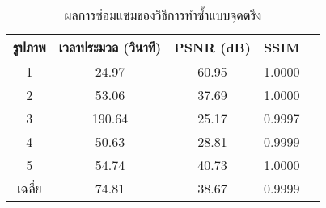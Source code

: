 \begin{table}[H]
	\centering
	\begin{tabular}[ht]{|c|c|c|c|c|}
		\hline
		รูปภาพ &เวลาประมวล  (วินาที) & PSNR (dB) & SSIM \\
		\hline
		1 & 24.97 & 60.95 & 1.0000 \\ 
		2 & 53.06 & 37.69 & 1.0000 \\
		3 &  190.64 & 25.17 & 0.9997 \\
		4 & 50.63  & 28.81  & 0.9999 \\
		5 & 54.74  & 40.73  & 1.0000 \\
		\hline
		เฉลี่ย & 74.81  & 38.67  & 0.9999 \\
		\hline
	\end{tabular}
	\caption{ผลการซ่อมแซมของวิธีการทำซ้ำแบบจุดตรึง}
\end{table}